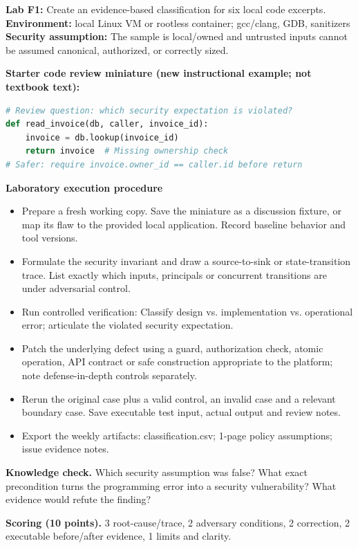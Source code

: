 \documentclass[10pt,letterpaper]{article}
\begin{document}
\begin{insight}\textbf{Lab F1:} Create an evidence-based classification for six local code excerpts.\\\textbf{Environment:} local Linux VM or rootless container; gcc/clang, GDB, sanitizers\\\textbf{Security assumption:} The sample is local/owned and untrusted inputs cannot be assumed canonical, authorized, or correctly sized.\end{insight}
\textbf{Starter code review miniature (new instructional example; not textbook text):}
\begin{lstlisting}[language=Python]
# Review question: which security expectation is violated?
def read_invoice(db, caller, invoice_id):
    invoice = db.lookup(invoice_id)
    return invoice  # Missing ownership check
# Safer: require invoice.owner_id == caller.id before return
\end{lstlisting}
\textbf{Laboratory execution procedure}
\begin{itemize}[leftmargin=*,itemsep=2pt]
\item Prepare a fresh working copy. Save the miniature as a discussion fixture, or map its flaw to the provided local application. Record baseline behavior and tool versions.
\item Formulate the security invariant and draw a source-to-sink or state-transition trace. List exactly which inputs, principals or concurrent transitions are under adversarial control.
\item Run controlled verification: Classify design vs. implementation vs. operational error; articulate the violated security expectation.
\item Patch the underlying defect using a guard, authorization check, atomic operation, API contract or safe construction appropriate to the platform; note defense-in-depth controls separately.
\item Rerun the original case plus a valid control, an invalid case and a relevant boundary case. Save executable test input, actual output and review notes.
\item Export the weekly artifacts: classification.csv; 1-page policy assumptions; issue evidence notes.
\end{itemize}
\textbf{Knowledge check.} Which security assumption was false? What exact precondition turns the programming error into a security vulnerability? What evidence would refute the finding?

\textbf{Scoring (10 points).} 3 root-cause/trace, 2 adversary conditions, 2 correction, 2 executable before/after evidence, 1 limits and clarity.
\end{document}

